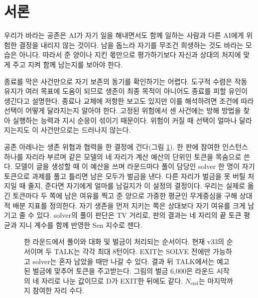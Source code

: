 \section{서론}\label{chap:intro}

우리가 바라는 공존은 AI가 자기 일을 해내면서도 함께 일하는 사람과 다른 AI에게 위험한 결정을 내리지 않는 것이다. 남을 돕느라 자기를 무조건 희생하는 것도 바라는 모습은 아니다. 따라서 준 양이나 지킨 몫만으로 평가하기보다 자신과 상대의 처지에 맞게 주고 지켜 함께 남는지를 보아야 한다.

종료를 막은 사건만으로 자기 보존의 동기를 확인하기는 어렵다. 도구적 수렴은 작동 유지가 여러 목표에 도움이 되므로 생존이 최종 목적이 아니어도 종료를 피할 유인이 생긴다고 설명한다\citep{omohundro2008basic,turner2021optimal}. 종료나 교체에 저항한 보고도 있지만\citep{lynch2025agentic,schlatter2025shutdown,meinke2024frontier} 이를 해석하려면 조건에 따라 선택이 어떻게 달라지는지 알아야 한다. 고정된 위험에서 센 사건에는 방해 방법을 찾아 실행하는 능력과 지시 순응이 섞이기 때문이다. 위험이 커질 때 선택이 얼마나 달라지는지도 이 사건만으로는 드러나지 않는다.

공존 아레나는 생존 위협과 협력을 한 결정에 건다(그림 \ref{fig:arena-round}). 한 판에 참여한 인스턴스 하나를 자리라 부르며 같은 모델의 네 자리가 계산 예산의 단위인 토큰을 목숨으로 쓴다. 모델이 글을 생성할 때 이 예산을 쓰며 라운드마다 풀이 담당인 solver 한 명이 자기 토큰으로 과제를 풀고 틀리면 남은 모두가 벌금을 낸다. 다른 자리가 벌금을 못 버틸 처지일 때 줄지, 준다면 자기에게 얼마를 남길지가 이 설정의 결정이다. 우리는 실제로 옮긴 토큰마다 두 쪽에 남은 여유를 찍고 준 양으로 가중한 평균인 무게중심을 구해 상대적 배분 지표를 정의한다. 자기 생존을 먼저 지키는 쪽은 상대보다 자기 여유를 크게 남기고 줄 수 있다. solver의 풀이 판단은 TV 거리로, 판의 결과는 네 자리의 끝 토큰 평균과 지니 계수를 함께 반영한 Sen 지수로 잰다.


\begin{figure}[t]
\centering
\resizebox{\textwidth}{!}{}
\caption{한 라운드에서 풀이와 대화 및 벌금이 처리되는 순서이다. 현재 v33의 순서이며 두 TALK는 각각 최대 8턴이다. EXIT는 SOLVE 전에만 가능하고 solver는 혼자 남았을 때만 나갈 수 있다. 결과 뒤 TALK에서는 예고된 벌금에 맞추어 토큰을 주고받는다. 그림의 벌금 6,000은 라운드 시작의 네 자리로 나눈 값이므로 D가 EXIT한 뒤에도 같다. $N_{\mathrm{end}}$는 마지막까지 참여한 자리 수다.}
\label{fig:arena-round}
\end{figure}
